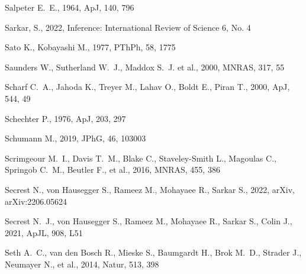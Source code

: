 \documentclass[fleqn,usenatbib]{mnras}
\begin{document}
\begin{thebibliography}{}
 Salpeter E.~E., 1964, ApJ, 140, 796

 Sarkar, S., 2022, Inference: International Review of Science 6, No. 4

 Sato K., Kobayashi M., 1977, PThPh, 58, 1775

 Saunders W., Sutherland W.~J., Maddox S.~J. et al., 2000, MNRAS, 317, 55

 Scharf C.~A., Jahoda K., Treyer M., Lahav O., Boldt E., Piran T., 2000, ApJ, 544, 49


 Schechter P., 1976, ApJ, 203, 297

 Schumann M., 2019, JPhG, 46, 103003


 Scrimgeour M.~I., Davis T.~M., Blake C., Staveley-Smith L., Magoulas C., Springob C.~M., Beutler F., et al., 2016, MNRAS, 455, 386

 Secrest N., von Hausegger S., Rameez M., Mohayaee R., Sarkar S., 2022, arXiv, arXiv:2206.05624

 Secrest N.~J., von Hausegger S., Rameez M., Mohayaee R., Sarkar S., Colin J., 2021, ApJL, 908, L51 %

 Seth A.~C., van den Bosch R., Mieske S., Baumgardt H., Brok M.~D., Strader J., Neumayer N., et al., 2014, Natur, 513, 398



\end{thebibliography}
\end{document}
